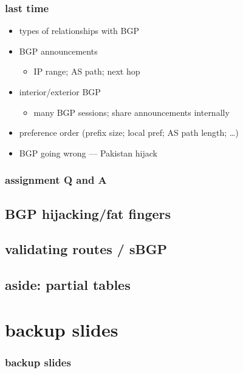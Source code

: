 \date{}
\title{}
\date{}

\begin{frame}
    \titlepage
\end{frame}



\begin{frame}
\frametitle{last time}
\begin{itemize}
\item types of relationships with BGP
\item BGP announcements
    \begin{itemize}
    \item IP range; AS path; next hop
    \end{itemize}
\item interior/exterior BGP
    \begin{itemize}
    \item many BGP sessions; share announcements internally
    \end{itemize}
\item preference order (prefix size; local pref; AS path length; \ldots)
\item BGP going wrong --- Pakistan hijack
\end{itemize}
\end{frame}

\begin{frame}
\frametitle{assignment Q and A}
\end{frame}

\subsection{BGP hijacking/fat fingers}


\subsection{validating routes / sBGP}



\subsection{aside: partial tables}






\section{backup slides}
\begin{frame}\frametitle{backup slides}
\end{frame}


